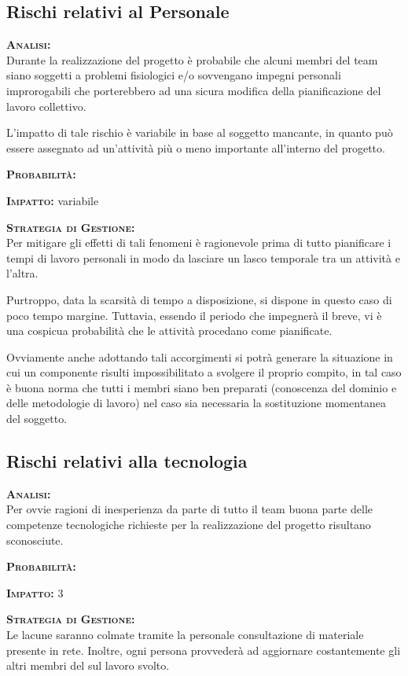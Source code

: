 \subsection{Rischi relativi al Personale}
\begin{description}
	\item{\scshape\bfseries Analisi:}\\
	Durante la realizzazione del progetto è probabile che alcuni membri del team siano soggetti a problemi fisiologici e/o sovvengano impegni personali improrogabili che porterebbero ad una sicura modifica della pianificazione del lavoro collettivo.
	
	L'impatto di tale rischio è variabile in base al soggetto mancante, in quanto può essere assegnato ad un'attività più o meno importante all'interno del progetto. 
	\item{\scshape\bfseries Probabilità:} \med
	\item{\scshape\bfseries Impatto:} variabile
	\item{\scshape\bfseries Strategia di Gestione:}\\
	Per mitigare gli effetti di tali fenomeni è ragionevole prima di tutto pianificare i tempi di lavoro personali in modo da lasciare un lasco temporale tra un attività e l'altra.
	
Purtroppo, data la scarsità di tempo a disposizione, si dispone in questo caso di poco tempo margine. Tuttavia, essendo il periodo che impegnerà il  breve, vi è una cospicua probabilità che le attività procedano come pianificate.
	
Ovviamente anche adottando tali accorgimenti si potrà generare la situazione in cui un componente risulti impossibilitato a svolgere il proprio compito, in tal caso è buona norma che tutti i membri siano ben preparati (conoscenza del dominio e delle metodologie di lavoro) nel caso sia necessaria la sostituzione momentanea del soggetto.
\end{description}

\subsection{Rischi relativi alla tecnologia}
\begin{description}
	\item{\scshape\bfseries Analisi:}\\
	Per ovvie ragioni di inesperienza da parte di tutto il team buona parte delle competenze tecnologiche richieste per la realizzazione del progetto risultano sconosciute.
	\item{\scshape\bfseries Probabilità:} \hi 
	\item{\scshape\bfseries Impatto:} 3 
	\item{\scshape\bfseries Strategia di Gestione:}\\
	Le lacune saranno colmate tramite la personale consultazione di materiale presente in rete. Inoltre, ogni persona provvederà ad aggiornare costantemente gli altri membri del  sul lavoro svolto.
\end{description}

